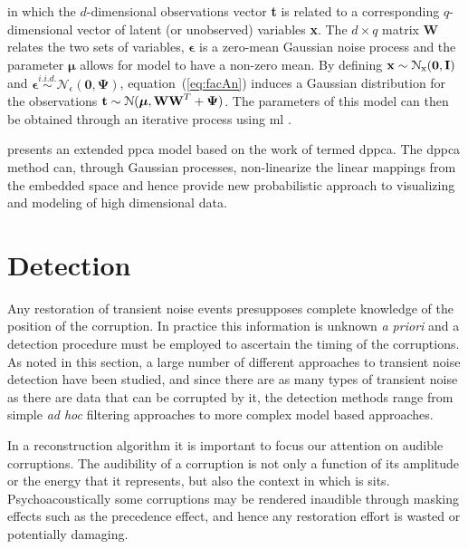 in which the $d$-dimensional observations vector \textbf{t} is related to a corresponding $q$-dimensional vector of latent (or unobserved) variables \textbf{x}. The $d \times q$ matrix \textbf{W} relates the two sets of variables, $\boldsymbol\epsilon$ is a zero-mean Gaussian noise process and the parameter $\boldsymbol\mu$ allows for model to have a non-zero mean. By defining $\textrm{\textbf{x}} \sim \mathcal{N}_\textrm{x}(\boldsymbol0,\textrm{\textbf{I}})$ and $\boldsymbol\epsilon \stackrel{i.i.d.}{\sim} \mathcal{N}_\epsilon(\boldsymbol0,\boldsymbol\Psi)$, equation~(\ref{eq:facAn}) induces a Gaussian distribution for the observations $\textrm{\textbf{t}} \sim \mathcal{N}(\boldsymbol\mu,\textrm{\textbf{W}}\textrm{\textbf{W}}^T + \boldsymbol\Psi)$. The parameters of this model can then be obtained through an iterative process using \gls{ml} \citep{Tipping1999}.

\cite{Lawrence2005} presents an extended \gls{ppca} model based on the work of \cite{Tipping1999} termed \gls{dppca}. The \gls{dppca} method can, through Gaussian processes, non-linearize the linear mappings from the embedded space and hence provide new probabilistic approach to visualizing and modeling of high dimensional data.



\section{Detection}\label{sec:LitRev_Detection}
Any restoration of transient noise events presupposes complete knowledge of the position of the corruption. In practice this information is unknown \emph{a priori} and a detection procedure must be employed to ascertain the timing of the corruptions. As noted in this section, a large number of different approaches to transient noise detection have been studied, and since there are as many types of transient noise as there are data that can be corrupted by it, the detection methods range from simple \emph{ad hoc} filtering approaches to more complex model based approaches.

In a reconstruction algorithm it is important to focus our attention on audible corruptions. The audibility of a corruption is not only a function of its amplitude or the energy that it represents, but also the context in which is sits. Psychoacoustically some corruptions may be rendered inaudible through masking effects such as the precedence effect, and hence any restoration effort is wasted or potentially damaging\cite{Moore2003}.

